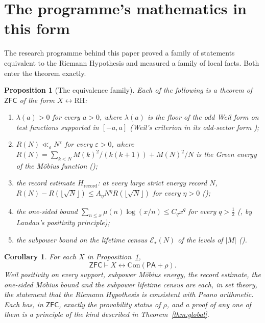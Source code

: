 \documentclass[11pt]{article}
\newtheorem{proposition}[theorem]{Proposition}
\newtheorem{corollary}[theorem]{Corollary}
\theoremstyle{definition}
\theoremstyle{remark}
\newcommand{\PA}{\mathsf{PA}}
\newcommand{\ZFC}{\mathsf{ZFC}}
\newcommand{\Con}{\mathrm{Con}}
\newcommand{\RH}{\mathrm{RH}}
\begin{document}
\section{The programme's mathematics in this form}\label{sec:programme}

The research programme behind this paper proved a family of statements equivalent to the Riemann Hypothesis and measured a family of local facts. Both enter the theorem exactly.

\begin{proposition}[The equivalence family]\label{prop:family}
Each of the following is a theorem of $\ZFC$ of the form $X\leftrightarrow\RH$:
\begin{enumerate}
\item[(W)] $\lambda(a)>0$ for every $a>0$, where $\lambda(a)$ is the floor of the odd Weil form on test functions supported in $[-a,a]$ (Weil's criterion in its odd-sector form \cite{Weil,Zhu});
\item[(E)] $R(N)\ll_\varepsilon N^\varepsilon$ for every $\varepsilon>0$, where $R(N)=\sum_{k<N}M(k)^2/(k(k+1))+M(N)^2/N$ is the Green energy of the M\"obius function (\cite[\S12]{MM2});
\item[(H)] the record estimate $H_{\mathrm{record}}$: at every large strict energy record $N$, $R(N)-R(\lfloor\sqrt N\rfloor)\le A_\eta N^\eta R(\lfloor\sqrt N\rfloor)$ for every $\eta>0$ (\cite[Theorem 3.1]{Hrec});
\item[(A)] the one-sided bound $\sum_{n\le x}\mu(n)\log(x/n)\le C_qx^q$ for every $q>\tfrac12$ (\cite[\S\S26, 62]{Census}, by Landau's positivity principle);
\item[(L)] the subpower bound on the lifetime census $\mathcal E_\star(N)$ of the levels of $|M|$ (\cite[\S\S3--4]{Census}).
\end{enumerate}
\end{proposition}

\begin{corollary}\label{cor:familycon}
For each $X$ in Proposition~\ref{prop:family},
\[
\ZFC\vdash X\leftrightarrow\Con(\PA+\rho).
\]
Weil positivity on every support, subpower M\"obius energy, the record estimate, the one-sided M\"obius bound and the subpower lifetime census are each, in set theory, the statement that the Riemann Hypothesis is consistent with Peano arithmetic. Each has, in $\ZFC$, exactly the provability status of $\rho$, and a proof of any one of them is a principle of the kind described in Theorem~\ref{thm:global}.
\end{corollary}
\end{document}
